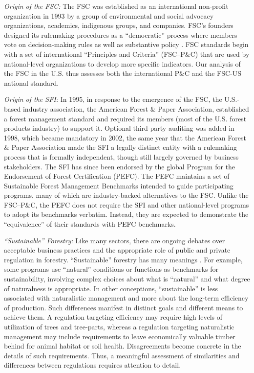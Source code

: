 \documentclass[
      12pt,
            Review ]{article}
\begin{document}
\emph{Origin of the FSC:} The FSC was established as an international
non-profit organization in 1993 by a group of environmental and social
advocacy organizations, academics, indigenous groups, and companies.
FSC's founders designed its rulemaking procedures as a ``democratic''
process where members vote on decision-making rules as well as
substantive policy \citep{Meidinger2003}. FSC standards begin with a set
of international ``Principles and Criteria'' (FSC--P\&C) that are used
by national-level organizations to develop more specific indicators. Our
analysis of the FSC in the U.S. thus assesses both the international
P\&C and the FSC-US national standard.

\emph{Origin of the SFI:} In 1995, in response to the emergence of the
FSC, the U.S.-based industry association, the American Forest \& Paper
Association, established a forest management standard and required its
members (most of the U.S. forest products industry) to support it.
Optional third-party auditing was added in 1998, which became mandatory
in 2002, the same year that the American Forest \& Paper Association
made the SFI a legally distinct entity with a rulemaking process that is
formally independent, though still largely governed by business
stakeholders. The SFI has since been endorsed by the global Program for
the Endorsement of Forest Certification (PEFC). The PEFC maintains a set
of Sustainable Forest Management Benchmarks intended to guide
participating programs, many of which are industry-backed alternatives
to the FSC. Unlike the FSC--P\&C, the PEFC does not require the SFI and
other national-level programs to adopt its benchmarks verbatim. Instead,
they are expected to demonstrate the ``equivalence'' of their standards
with PEFC benchmarks.

\emph{``Sustainable'' Forestry:} Like many sectors, there are ongoing
debates over acceptable business practices and the appropriate role of
public and private regulation in forestry. ``Sustainable'' forestry has
many meanings \citep{McDermott2012}. For example, some programs use
``natural'' conditions or functions as benchmarks for sustainability,
involving complex choices about what is ``natural'' and what degree of
naturalness is appropriate. In other conceptions, ``sustainable'' is
less associated with naturalistic management and more about the
long-term efficiency of production. Such differences manifest in
distinct goals and different means to achieve them. A regulation
targeting efficiency may require high levels of utilization of trees and
tree-parts, whereas a regulation targeting naturalistic management may
include requirements to leave economically valuable timber behind for
animal habitat or soil health. Disagreements become concrete in the
details of such requirements. Thus, a meaningful assessment of
similarities and differences between regulations requires attention to
detail.
\end{document}
